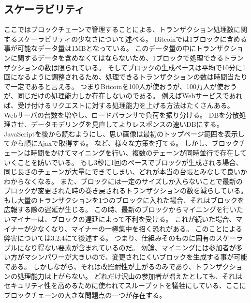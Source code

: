 \subsection{スケーラビリティ}
ここではブロックチェーンで管理することによる、トランザクション処理数に関するスケーラビリティの少なさについて述べる。
Bitcoinでは1ブロックに含める事が可能なデータ量は1MBとなっている。
このデータ量の中にトランザクションに関するデータを含めなくてはならないため、1ブロックで処理できるトランザクションの数は限られている。
そしてブロックの生成ペースは平均で10分に1回になるように調整されるため、処理できるトランザクションの数は時間当たりで一定であると言える。
つまりBitcoinを100人が使おうが、100万人が使おうが、同じだけの処理能力しか存在しないのである。
例えばWebサービスであれば、受け付けるリクエストに対する処理能力を上げる方法はたくさんある。
Webサーバの台数を増やし、ロードバランサで負荷を振り分ける。
DBを分散処理させ、データモデリングを見直してよりレスポンスの速いDBにする。
JavaScriptを後から読むようにし、思い画像は最初のトップページ範囲を表示してから順にAjaxで取得する。
など、様々な方策を打てる。
しかし、ブロックチェーンは時間をかけてマイニングを行い、複数のチェーンが同時並行で存在していくことを防いでいる。
もし3秒に1回のペースでブロックが生成される場合、同じ長さのチェーンが大量にできてしまい、どれが本当の台帳とみなして良いかわからなくなる。
また、ブロックには一定のサイズしか入らないことで最新のブロックが変更された時の巻き戻されるトランザクションの数を減らしている。
もし大量のトランザクションを1つのブロックに入れた場合、それはブロックを広報する際の遅延が生じる。
この時、最新のブロックからマイニングを行いたいマイナーは、ブロックの遅延によって不利を受ける。
これが続いた場合、マイナーが少なくなり、マイナーの一極集中を招く恐れがある。
このことによる弊害については3.2.4にて後述する。
つまり、仕組みそのものに固有のスケーラブルになり得ない要素が含まれているのだ。
勿論、マイニングには参加者が多い方がマシンパワーが大きいので、変更されにくいブロックを生成する事が可能である。
しかしながら、それは改竄耐性が上がるのみであり、トランザクションの処理能力は上がらない。
どれだけ沢山の参加者が増えたとしても、それはセキュリティ性を高めるために使われてスループットを犠牲にしている、ここにブロックチェーンの大きな問題点の一つが存在する。

